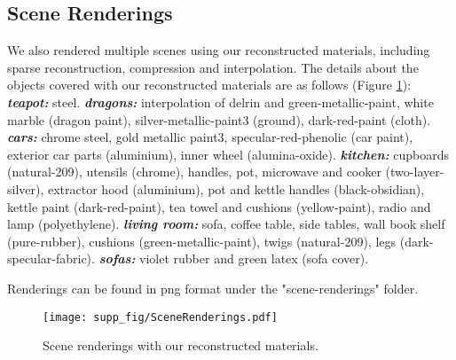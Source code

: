 \subsection{Scene Renderings}
We also rendered multiple scenes \cite{resources16} using our reconstructed materials, including sparse reconstruction, compression and interpolation. The details about the objects covered with our reconstructed materials are as follows (Figure \ref{fig:scene-render}): \textbf{\textit{teapot:}} steel. \textbf{\textit{dragons:}} interpolation of delrin and green-metallic-paint, white marble (dragon paint), silver-metallic-paint3 (ground), dark-red-paint (cloth). \textbf{\textit{cars:}} chrome steel, gold metallic paint3, specular-red-phenolic (car paint), exterior car parts (aluminium), inner wheel (alumina-oxide). \textbf{\textit{kitchen:}} cupboards (natural-209), utensils (chrome), handles, pot, microwave and cooker (two-layer-silver), extractor hood (aluminium), pot and kettle handles (black-obsidian), kettle paint (dark-red-paint), tea towel and cushions (yellow-paint), radio and lamp (polyethylene). \textbf{\textit{living room:}} sofa, coffee table, side tables, wall book shelf (pure-rubber), cushions (green-metallic-paint), twigs (natural-209), legs (dark-specular-fabric).
\textbf{\textit{sofas:}} violet rubber and green latex (sofa cover). 

Renderings can be found in png format under the "scene-renderings" folder.



\begin{figure}[h]
  \centering

  {\texttt{[image: supp\_fig/SceneRenderings.pdf]}}
   \caption{Scene renderings with our reconstructed materials.}
   \label{fig:scene-render}
\end{figure}


        
